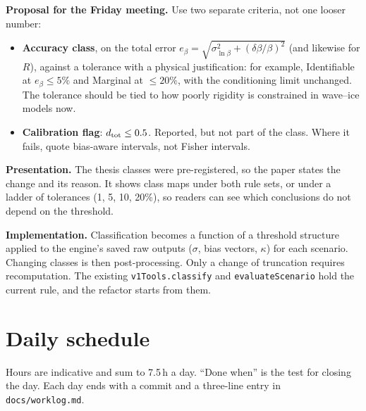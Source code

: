 \documentclass[10pt,a4paper]{article}
\begin{document}
\textbf{Proposal for the Friday meeting.} Use two separate criteria, not one looser number:
\begin{itemize}
\item \textbf{Accuracy class}, on the total error $e_\beta=\sqrt{\sigma_{\ln\beta}^2+(\delta\beta/\beta)^2}$ (and likewise for $R$), against a tolerance with a physical justification: for example, Identifiable at $e_\beta\le5\%$ and Marginal at $\le20\%$, with the conditioning limit unchanged. The tolerance should be tied to how poorly rigidity is constrained in wave--ice models now.
\item \textbf{Calibration flag}: $d_{\rm tot}\le0.5$. Reported, but not part of the class. Where it fails, quote bias-aware intervals, not Fisher intervals.
\end{itemize}
\textbf{Presentation.} The thesis classes were pre-registered, so the paper states the change and its reason. It shows class maps under both rule sets, or under a ladder of tolerances (1, 5, 10, 20\%), so readers can see which conclusions do not depend on the threshold.

\textbf{Implementation.} Classification becomes a function of a threshold structure applied to the engine's saved raw outputs ($\sigma$, bias vectors, $\kappa$) for each scenario. Changing classes is then post-processing. Only a change of truncation requires recomputation. The existing \texttt{v1Tools.classify} and \texttt{evaluateScenario} hold the current rule, and the refactor starts from them.

\section{Daily schedule}
Hours are indicative and sum to 7.5\,h a day. ``Done when'' is the test for closing the day. Each day ends with a commit and a three-line entry in \texttt{docs/worklog.md}.
\end{document}
